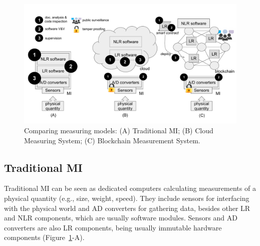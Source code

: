 \documentclass[journal]{IEEEtran}
\begin{document}
\begin{figure}[!t]
\centering
\includegraphics[width=.69\textwidth]{measuring} %
\caption{Comparing measuring models: (A) Traditional MI; (B) Cloud Measuring System; (C) Blockchain Measurement System.}
\label{f:compare}
\end{figure}

\subsection{Traditional MI}
\label{s:mi_traditional}
Traditional MI can be seen as dedicated computers calculating measurements of a physical quantity (e.g., size, weight, speed). They include sensors for interfacing with the physical world and AD converters for gathering data, besides other LR and NLR components, which are usually software modules. Sensors and AD converters are also LR components, being usually immutable hardware components (Figure~\ref{f:compare}-A).
\end{document}
